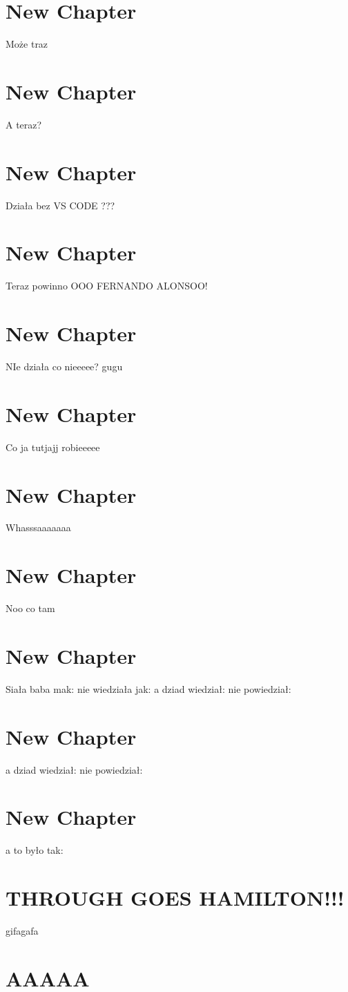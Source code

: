 \documentclass{article}
\begin{document}
\section{New Chapter}
Może traz
\section{New Chapter}
A teraz?
\section{New Chapter}
Działa bez VS CODE ???
\section{New Chapter}
Teraz powinno OOO FERNANDO ALONSOO!
\section{New Chapter}
NIe działa co nieeeee? gugu
\section{New Chapter}
Co ja tutjajj robieeeee
\section{New Chapter}
Whasssaaaaaaa
\section{New Chapter}
Noo co tam
\section{New Chapter}
Siała baba mak: nie wiedziała jak: a dziad wiedział: nie powiedział:
\section{New Chapter}
a dziad wiedział: nie powiedział:
\section{New Chapter}
a to było tak:



\section{THROUGH GOES HAMILTON!!!}
gifagafa
\section{AAAAA}
\end{document}
